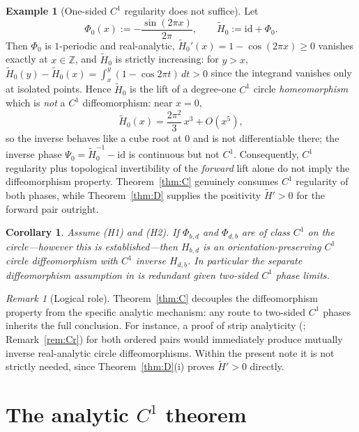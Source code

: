 \documentclass[11pt]{article}
\newtheorem{corollary}[theorem]{Corollary}
\theoremstyle{definition}
\newtheorem{example}[theorem]{Example}
\theoremstyle{remark}
\newtheorem{remark}[theorem]{Remark}
\newcommand{\Z}{\mathbb{Z}}
\newcommand{\Ht}{\widetilde H}
\begin{document}
\begin{example}[One-sided $C^{1}$ regularity does not suffice]\label{ex:counter}
Let
\[
\Phi_0(x):=-\frac{\sin(2\pi x)}{2\pi},
\qquad
\Ht_0:=\mathrm{id}+\Phi_0 .
\]
Then $\Phi_0$ is $1$-periodic and real-analytic,
$\Ht_0'(x)=1-\cos(2\pi x)\ge0$ vanishes exactly at $x\in\Z$, and $\Ht_0$
is strictly increasing: for $y>x$,
$\Ht_0(y)-\Ht_0(x)=\int_x^y(1-\cos2\pi t)\,dt>0$ since the integrand
vanishes only at isolated points. Hence $\Ht_0$ is the lift of a
degree-one $C^{1}$ circle \emph{homeomorphism} which is \emph{not} a
$C^{1}$ diffeomorphism: near $x=0$,
\[
\Ht_0(x)=\frac{2\pi^{2}}{3}\,x^{3}+O(x^{5}),
\]
so the inverse behaves like a cube root at $0$ and is not differentiable
there; the inverse phase $\Psi_0=\Ht_0^{-1}-\mathrm{id}$ is continuous
but not $C^{1}$. Consequently, $C^{1}$ regularity plus topological
invertibility of the \emph{forward} lift alone do not imply the
diffeomorphism property. Theorem~\ref{thm:C} genuinely consumes $C^{1}$
regularity of both phases, while Theorem~\ref{thm:D} supplies the
positivity $\Ht'>0$ for the forward pair outright.
\end{example}

\begin{corollary}\label{cor:redundant}
Assume \textup{(H1)} and \textup{(H2)}. If $\Phi_{b,d}$ and $\Phi_{d,b}$
are of class $C^{1}$ on the circle---however this is established---then
$H_{b,d}$ is an orientation-preserving $C^{1}$ circle diffeomorphism with
$C^{1}$ inverse $H_{d,b}$. In particular the separate diffeomorphism
assumption in \cite[Prop.~6.6]{J} is redundant given two-sided $C^{1}$
phase limits.
\end{corollary}

\begin{remark}[Logical role]\label{rem:role}
Theorem~\ref{thm:C} decouples the diffeomorphism property from the
specific analytic mechanism: any route to two-sided $C^{1}$ phases
inherits the full conclusion. For instance, a proof of strip analyticity
(\cite[Conj.~8.1]{J}; Remark~\ref{rem:Cr}) for both ordered pairs would
immediately produce mutually inverse real-analytic circle
diffeomorphisms. Within the present note it is not strictly needed,
since Theorem~\ref{thm:D}(i) proves $\Ht'>0$ directly.
\end{remark}

\section{The analytic $C^{1}$ theorem}\label{sec:C1}
\end{document}
